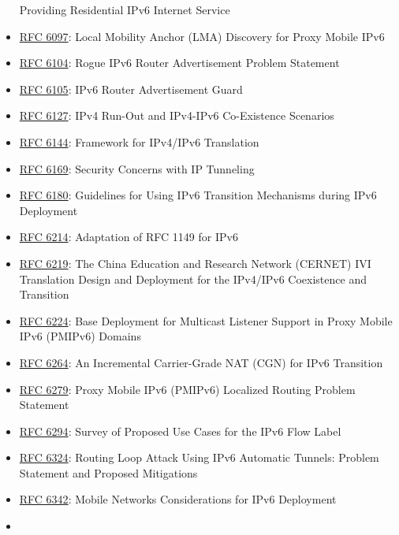 \documentclass[
]{article}
\begin{document}
\begin{itemize}
  Providing Residential IPv6 Internet Service
\item
  \href{https://www.rfc-editor.org/info/rfc6097}{RFC 6097}: Local
  Mobility Anchor (LMA) Discovery for Proxy Mobile IPv6
\item
  \href{https://www.rfc-editor.org/info/rfc6104}{RFC 6104}: Rogue IPv6
  Router Advertisement Problem Statement
\item
  \href{https://www.rfc-editor.org/info/rfc6105}{RFC 6105}: IPv6 Router
  Advertisement Guard
\item
  \href{https://www.rfc-editor.org/info/rfc6127}{RFC 6127}: IPv4 Run-Out
  and IPv4-IPv6 Co-Existence Scenarios
\item
  \href{https://www.rfc-editor.org/info/rfc6144}{RFC 6144}: Framework
  for IPv4/IPv6 Translation
\item
  \href{https://www.rfc-editor.org/info/rfc6169}{RFC 6169}: Security
  Concerns with IP Tunneling
\item
  \href{https://www.rfc-editor.org/info/rfc6180}{RFC 6180}: Guidelines
  for Using IPv6 Transition Mechanisms during IPv6 Deployment
\item
  \href{https://www.rfc-editor.org/info/rfc6214}{RFC 6214}: Adaptation
  of RFC 1149 for IPv6
\item
  \href{https://www.rfc-editor.org/info/rfc6219}{RFC 6219}: The China
  Education and Research Network (CERNET) IVI Translation Design and
  Deployment for the IPv4/IPv6 Coexistence and Transition
\item
  \href{https://www.rfc-editor.org/info/rfc6224}{RFC 6224}: Base
  Deployment for Multicast Listener Support in Proxy Mobile IPv6
  (PMIPv6) Domains
\item
  \href{https://www.rfc-editor.org/info/rfc6264}{RFC 6264}: An
  Incremental Carrier-Grade NAT (CGN) for IPv6 Transition
\item
  \href{https://www.rfc-editor.org/info/rfc6279}{RFC 6279}: Proxy Mobile
  IPv6 (PMIPv6) Localized Routing Problem Statement
\item
  \href{https://www.rfc-editor.org/info/rfc6294}{RFC 6294}: Survey of
  Proposed Use Cases for the IPv6 Flow Label
\item
  \href{https://www.rfc-editor.org/info/rfc6324}{RFC 6324}: Routing Loop
  Attack Using IPv6 Automatic Tunnels: Problem Statement and Proposed
  Mitigations
\item
  \href{https://www.rfc-editor.org/info/rfc6342}{RFC 6342}: Mobile
  Networks Considerations for IPv6 Deployment
\item

\end{itemize}
\end{document}
